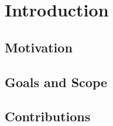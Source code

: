 \chapter{Introduction}
\label{ch:introduction}

\section{Motivation}
\label{sec:motivation}


\section{Goals and Scope}
\label{sec:goals}


\section{Contributions}
\label{sec:contributions}


